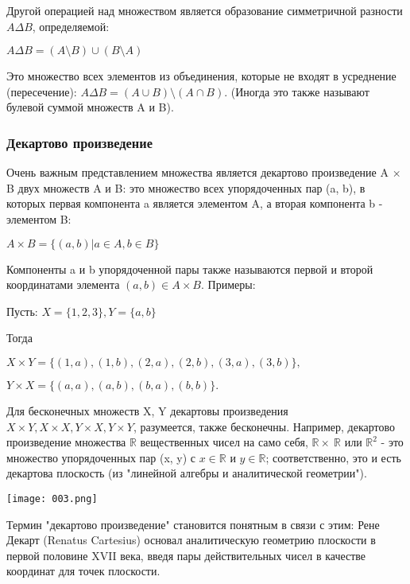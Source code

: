 Другой операцией над множеством является образование симметричной разности \(A \Delta B\), определяемой:

\vspace{0.5cm}
\(A \Delta B = (A \setminus B) \cup (B \setminus A)\)

\vspace{0.5cm}
Это множество всех элементов из объединения, которые не входят в усреднение (пересечение): \(A \Delta B = (A \cup B) \setminus (A \cap B)\). (Иногда это также называют булевой суммой множеств A и B).

\subsubsection{Декартово произведение}
Очень важным представлением множества является декартово произведение A × B двух множеств A и B: это множество всех упорядоченных пар (a, b), в которых первая компонента a является элементом A, а вторая компонента b - элементом B:

\vspace{0.5cm}
\(A \times B = \{(a,b) | a \in A, b \in B\}\)

\vspace{0.5cm}
Компоненты a и b упорядоченной пары также называются первой и второй координатами элемента \((a,b) \in A \times B\). Примеры:

Пусть: \(X=\{1,2,3\}, Y=\{a,b\}\)
\vspace{0.5cm}

Тогда

\(X \times Y=\{(1,a),(1,b),(2,a),(2,b),(3,a),(3,b)\},\)

\(Y \times X=\{(a,a),(a,b),(b,a),(b,b)\}.\)
\vspace{0.5cm}

Для бесконечных множеств X, Y декартовы произведения \(X \times Y, X \times X, Y \times X, Y \times Y\), разумеется, также бесконечны.
Например, декартово произведение множества \(\mathbb{R}\) вещественных чисел на само себя, \(\mathbb{R} \times \ \mathbb{R}\) или \(\mathbb{R}^2\) - это множество упорядоченных пар (x, y) с \(x \in \mathbb{R}\) и \(y \in \mathbb{R}\); соответственно, это и есть декартова плоскость (из "линейной алгебры и аналитической геометрии").
\begin{center}
  \texttt{[image: 003.png]}
\end{center}
Термин "декартово произведение" становится понятным в связи с этим: Рене Декарт (Renatus Cartesius) основал аналитическую геометрию плоскости в первой половине XVII века, введя пары действительных чисел в качестве координат для точек плоскости.

